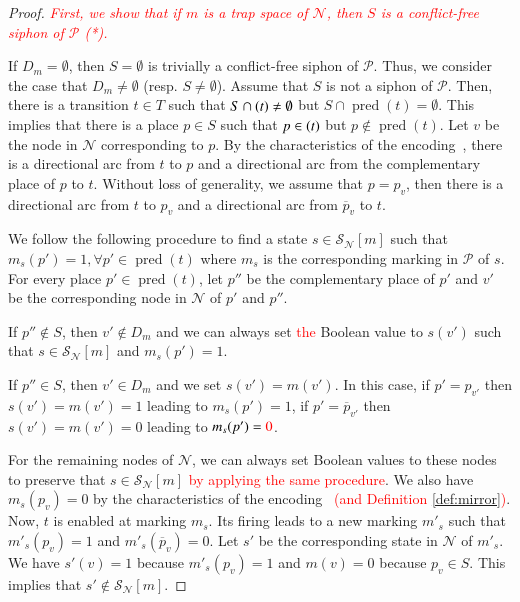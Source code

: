 \documentclass[preprint,12pt]{elsarticle}
\newcommand{\change}[1]{\textcolor{red}{#1}}
\DeclareMathOperator{\pred}{pred}
\let\succ\relax
\DeclareMathOperator{\succ}{succ}
\begin{document}
\begin{proof}

  \change{\textit{First, we show that if \(m\) is a trap space of \(\mathcal{N}\), then \(S\) is a conflict-free siphon of \(\mathcal{P}\) (*).}}

  If \(D_m = \emptyset\), then \(S = \emptyset\) is trivially a conflict-free siphon of \(\mathcal{P}\).
  Thus, we consider the case that \(D_m \neq \emptyset\) (resp. \(S \neq \emptyset\)).
  Assume that \(S\) is not a siphon of \(\mathcal{P}\).
  Then, there is a transition \(t \in T\) such that \(S \cap \succ(t) \neq \emptyset\) but \(S \cap \pred(t) = \emptyset\).
  This implies that there is a place \(p \in S\) such that \(p \in \succ(t)\) but \(p \not \in \pred(t)\).
  Let \(v\) be the node in \(\mathcal{N}\) corresponding to \(p\).
  By the characteristics of the encoding~\cite{chaouiya2004qualitative}, there is a directional arc from \(t\) to \(p\) and a directional arc from the complementary place of \(p\) to \(t\).
  Without loss of generality, we assume that \(p = p_v\), then there is a directional arc from \(t\) to \(p_v\) and a directional arc from \(\overline{p}_v\) to \(t\).

  We follow the following procedure to find a state \(s \in \mathcal{S}_{\mathcal{N}}[m]\) such that \(m_s(p') = 1, \forall p' \in \pred(t)\) where \(m_s\) is the corresponding marking in \(\mathcal{P}\) of \(s\).
  For every place \(p' \in \pred(t)\), let \(p''\) be the complementary place of \(p'\) and \(v'\) be the corresponding node in \(\mathcal{N}\) of \(p'\) and \(p''\).

  If \(p'' \not \in S\), then \(v' \not \in D_m\) and we can always set \change{the} Boolean value to \(s(v')\) such that \(s \in \mathcal{S}_{\mathcal{N}}[m]\) and \(m_s(p') = 1\).

  If \(p'' \in S\), then \(v' \in D_m\) and we set \(s(v') = m(v')\).
  In this case, if \(p' = p_{v'}\) then \(s(v') = m(v') = 1\) leading to \(m_s(p') = 1\), if \(p' = \overline{p}_{v'}\) then \(s(v') = m(v') = 0\) leading to \(m_s(p') = \change{0}\).

  For the remaining nodes of \(\mathcal{N}\), we can always set Boolean values to these nodes to preserve that \(s \in \mathcal{S}_{\mathcal{N}}[m]\) \change{by applying the same procedure}.
  We also have \(m_s(p_v) = 0\) by the characteristics of the encoding~\cite{chaouiya2004qualitative} \change{(and Definition \ref{def:mirror})}.
  Now, \(t\) is enabled at marking \(m_s\).
  Its firing leads to a new marking \(m'_s\) such that \(m'_s(p_v) = 1\) and \(m'_s(\overline{p}_v) = 0\).
  Let \(s'\) be the corresponding state in \(\mathcal{N}\) of \(m'_s\).
  We have \(s'(v) = 1\) because \(m'_s(p_v) = 1\) and \(m(v) = 0\) because \(p_v \in S\).
  This implies that \(s' \not \in \mathcal{S}_{\mathcal{N}}[m]\).


\end{proof}
\end{document}
